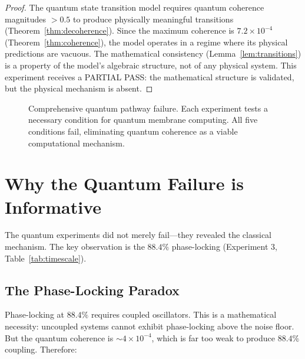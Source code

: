 \documentclass[12pt]{article}
\theoremstyle{definition}
\theoremstyle{remark}
\begin{document}
\begin{proof}
The quantum state transition model requires quantum coherence magnitudes $> 0.5$ to produce physically meaningful transitions (Theorem~\ref{thm:decoherence}). Since the maximum coherence is $7.2 \times 10^{-4}$ (Theorem~\ref{thm:coherence}), the model operates in a regime where its physical predictions are vacuous. The mathematical consistency (Lemma~\ref{lem:transitions}) is a property of the model's algebraic structure, not of any physical system. This experiment receives a PARTIAL PASS: the mathematical structure is validated, but the physical mechanism is absent. \qedhere
\end{proof}

\begin{figure}[H]
\centering
{}
\caption{Comprehensive quantum pathway failure. Each experiment tests a necessary condition for quantum membrane computing. All five conditions fail, eliminating quantum coherence as a viable computational mechanism.}
\label{fig:quantum_summary}
\end{figure}


\section{Why the Quantum Failure is Informative}
\label{sec:quantum_informative}

The quantum experiments did not merely fail---they revealed the classical mechanism. The key observation is the $88.4\%$ phase-locking (Experiment 3, Table~\ref{tab:timescale}).

\subsection{The Phase-Locking Paradox}

Phase-locking at $88.4\%$ requires coupled oscillators. This is a mathematical necessity: uncoupled systems cannot exhibit phase-locking above the noise floor. But the quantum coherence is $\sim 4 \times 10^{-4}$, which is far too weak to produce $88.4\%$ coupling. Therefore:
\end{document}
